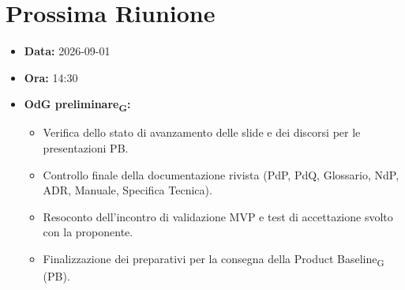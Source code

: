 
\section{Prossima Riunione}

\begin{itemize}

\item \textbf{Data:} 2026-09-01

\item \textbf{Ora:} 14:30

\item \textbf{OdG preliminare\textsubscript{G}:}

\begin{itemize}

\item Verifica dello stato di avanzamento delle slide e dei discorsi per le presentazioni PB.

\item Controllo finale della documentazione rivista (PdP, PdQ, Glossario, NdP, ADR, Manuale, Specifica Tecnica).

\item Resoconto dell'incontro di validazione MVP e test di accettazione svolto con la proponente.

\item Finalizzazione dei preparativi per la consegna della Product Baseline\textsubscript{G} (PB).

\end{itemize}

\end{itemize}